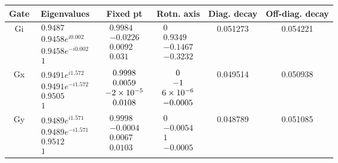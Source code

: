 {\begin{table}[h]
\begin{center}
\begin{tabular}[l]{|c|c|c|c|c|c|}
\hline
Gate & Eigenvalues & Fixed pt & Rotn. axis & Diag. decay & Off-diag. decay \\ \hline
Gi & $ \begin{array}{c}
0.9487 \\ 
0.9458e^{i0.002} \\ 
0.9458e^{-i0.002} \\ 
1
 \end{array} $
 & $ \begin{array}{c}
0.9984 \\ 
-0.0226 \\ 
0.0092 \\ 
0.031
 \end{array} $
 & $ \begin{array}{c}
0 \\ 
0.9349 \\ 
-0.1467 \\ 
-0.3232
 \end{array} $
 & 0.051273 & 0.054221 \\ \hline
Gx & $ \begin{array}{c}
0.9491e^{i1.572} \\ 
0.9491e^{-i1.572} \\ 
0.9505 \\ 
1
 \end{array} $
 & $ \begin{array}{c}
0.9998 \\ 
0.0059 \\ 
-2\times 10^{-5} \\ 
0.0108
 \end{array} $
 & $ \begin{array}{c}
0 \\ 
-1 \\ 
6\times 10^{-6} \\ 
-0.0005
 \end{array} $
 & 0.049514 & 0.050938 \\ \hline
Gy & $ \begin{array}{c}
0.9489e^{i1.571} \\ 
0.9489e^{-i1.571} \\ 
0.9512 \\ 
1
 \end{array} $
 & $ \begin{array}{c}
0.9998 \\ 
-0.0004 \\ 
0.0067 \\ 
0.0103
 \end{array} $
 & $ \begin{array}{c}
0 \\ 
-0.0054 \\ 
1 \\ 
-0.0005
 \end{array} $
 & 0.048789 & 0.051085 \\ \hline
\end{tabular}


\end{center}
\end{table}}
